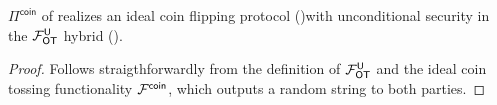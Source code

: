 \begin{lemma}\label{lem:OTtoC}
	$\Pi^{\textsf{coin}}$ of  realizes an ideal coin flipping protocol \iffullversion()\fi with unconditional security  in the $\mathcal{F}_{\mathsf{OT}}^{\mathsf{U}}$ hybrid  ().
\end{lemma}
\begin{proof}
	Follows straigthforwardly from the definition of $\mathcal{F}_{\mathsf{OT}}^{\mathsf{U}}$ and the ideal coin tossing functionality $\mathcal{F}^{\mathsf{coin}}$, which outputs a random string to both parties.
	\pe
\end{proof}







% 

